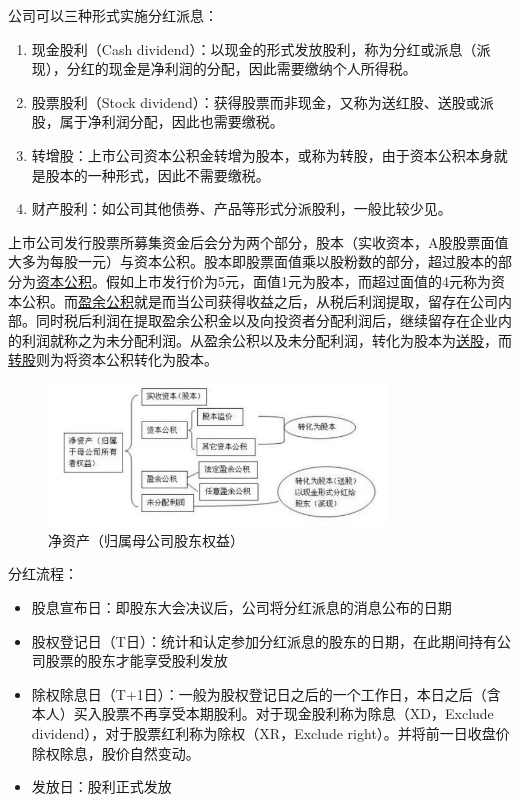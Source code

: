 \documentclass[11pt]{article}
\begin{document}
\begin{appendices}
公司可以三种形式实施分红派息：
\begin{enumerate}
    \item 现金股利（Cash dividend）：以现金的形式发放股利，称为分红或派息（派现），分红的现金是净利润的分配，因此需要缴纳个人所得税。
    \item 股票股利（Stock dividend）：获得股票而非现金，又称为送红股、送股或派股，属于净利润分配，因此也需要缴税。
    \item 转增股：上市公司资本公积金转增为股本，或称为转股，由于资本公积本身就是股本的一种形式，因此不需要缴税。
    \item 财产股利：如公司其他债券、产品等形式分派股利，一般比较少见。
\end{enumerate}

上市公司发行股票所募集资金后会分为两个部分，股本（实收资本，A股股票面值大多为每股一元）与资本公积。股本即股票面值乘以股粉数的部分，超过股本的部分为\uline{资本公积}。假如上市发行价为5元，面值1元为股本，而超过面值的4元称为资本公积。而\uline{盈余公积}就是而当公司获得收益之后，从税后利润提取，留存在公司内部。同时税后利润在提取盈余公积金以及向投资者分配利润后，继续留存在企业内的利润就称之为未分配利润。从盈余公积以及未分配利润，转化为股本为\uline{送股}，而\uline{转股}则为将资本公积转化为股本。

\begin{figure}[H]
    \centering
    \includegraphics[width=0.8\textwidth]{fig/net-asset.jpeg}
    \caption{净资产（归属母公司股东权益）}
    \label{fig:net-asset}
\end{figure}

分红流程：
\begin{itemize}
    \item 股息宣布日：即股东大会决议后，公司将分红派息的消息公布的日期
    \item 股权登记日（T日）：统计和认定参加分红派息的股东的日期，在此期间持有公司股票的股东才能享受股利发放
    \item 除权除息日（T+1日）：一般为股权登记日之后的一个工作日，本日之后（含本人）买入股票不再享受本期股利。对于现金股利称为除息（XD，Exclude dividend），对于股票红利称为除权（XR，Exclude right）。并将前一日收盘价除权除息，股价自然变动。
    \item 发放日：股利正式发放
\end{itemize}


\end{appendices}
\end{document}
